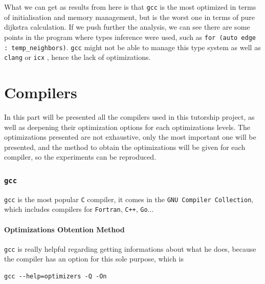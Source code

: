 \documentclass{rapport}
\newcommand{\gcc}{\texttt{gcc} }
\newcommand{\icx}{\texttt{icx} }
\newcommand{\clang}{\texttt{clang} }
\begin{document}
What we can get as results from here is that \gcc is the most optimized in terms of initialisation and memory management, but is the worst one in terms 
of pure dijkstra calculation. \newline
If we push further the analysis, we can see there are some points in the program where types inference were used, such as \texttt{for (auto edge : temp\_neighbors)}. 
\gcc might not be able to manage this type system as well as \clang or \icx, hence the lack of optimizations.

\clearpage
\part{Compilers}
In this part will be presented all the compilers used in this tutorship project, as well as deepening their optimization options for each optimizations levels.
\newline
The optimizations presented are not exhaustive, only the most important one will be presented, and the method to obtain the optimizations will be given
for each compiler, so the experiments can be reproduced.




\section{\gcc}
\gcc is the most popular \texttt{C} compiler, it comes in the \texttt{GNU Compiler Collection}, which includes compilers for \texttt{Fortran}, \texttt{C++}, \texttt{Go}...

\subsection*{Optimizations Obtention Method}
\gcc is really helpful regarding getting informations about what he does, because the compiler has an option for this sole purpose, which is
\begin{verbatim}
gcc --help=optimizers -Q -On
\end{verbatim}
\end{document}
